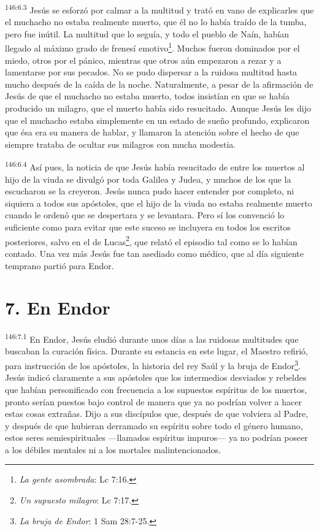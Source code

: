 \par 
\textsuperscript{146:6.3} Jesús se esforzó por calmar a la multitud y trató en vano de explicarles que el muchacho no estaba realmente muerto, que él no lo había traído de la tumba, pero fue inútil. La multitud que lo seguía, y todo el pueblo de Naín, habían llegado al máximo grado de frenesí emotivo\footnote{\textit{La gente asombrada}: Lc 7:16.}. Muchos fueron dominados por el miedo, otros por el pánico, mientras que otros aún empezaron a rezar y a lamentarse por sus pecados. No se pudo dispersar a la ruidosa multitud hasta mucho después de la caída de la noche. Naturalmente, a pesar de la afirmación de Jesús de que el muchacho no estaba muerto, todos insistían en que se había producido un milagro, que el muerto había sido resucitado. Aunque Jesús les dijo que el muchacho estaba simplemente en un estado de sueño profundo, explicaron que ésa era su manera de hablar, y llamaron la atención sobre el hecho de que siempre trataba de ocultar sus milagros con mucha modestia.

\par 
\textsuperscript{146:6.4} Así pues, la noticia de que Jesús había resucitado de entre los muertos al hijo de la viuda se divulgó por toda Galilea y Judea, y muchos de los que la escucharon se la creyeron. Jesús nunca pudo hacer entender por completo, ni siquiera a todos sus apóstoles, que el hijo de la viuda no estaba realmente muerto cuando le ordenó que se despertara y se levantara. Pero sí los convenció lo suficiente como para evitar que este suceso se incluyera en todos los escritos posteriores, salvo en el de Lucas\footnote{\textit{Un supuesto milagro}: Lc 7:17.}, que relató el episodio tal como se lo habían contado. Una vez más Jesús fue tan asediado como médico, que al día siguiente temprano partió para Endor.

\section*{7. En Endor}
\par 
\textsuperscript{146:7.1} En Endor, Jesús eludió durante unos días a las ruidosas multitudes que buscaban la curación física. Durante su estancia en este lugar, el Maestro refirió, para instrucción de los apóstoles, la historia del rey Saúl y la bruja de Endor\footnote{\textit{La bruja de Endor}: 1 Sam 28:7-25.}. Jesús indicó claramente a sus apóstoles que los intermedios desviados y rebeldes que habían personificado con frecuencia a los supuestos espíritus de los muertos, pronto serían puestos bajo control de manera que ya no podrían volver a hacer estas cosas extrañas. Dijo a sus discípulos que, después de que volviera al Padre, y después de que hubieran derramado su espíritu sobre todo el género humano, estos seres semiespirituales ---llamados espíritus impuros--- ya no podrían poseer a los débiles mentales ni a los mortales malintencionados.

